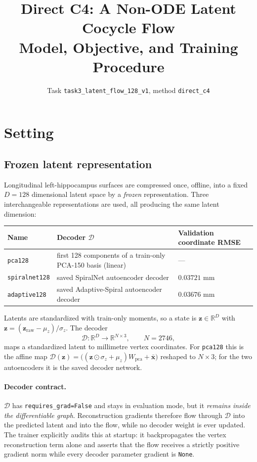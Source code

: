 \documentclass[11pt]{article}
\title{Direct C4: A Non-ODE Latent Cocycle Flow\\
\large Model, Objective, and Training Procedure}
\author{Task \texttt{task3\_latent\_flow\_128\_v1}, method \texttt{direct\_c4}}
\date{}
\newcommand{\R}{\mathbb{R}}
\newcommand{\z}{\bm{z}}
\newcommand{\Dec}{\mathcal{D}}
\begin{document}
\maketitle

\section{Setting}

\subsection{Frozen latent representation}

Longitudinal left-hippocampus surfaces are compressed once, offline, into a fixed
$D = 128$ dimensional latent space by a \emph{frozen} representation. Three
interchangeable representations are used, all producing the same latent dimension:

\begin{center}
\begin{tabular}{lll}
\toprule
Name & Decoder $\Dec$ & Validation coordinate RMSE \\
\midrule
\texttt{pca128}       & first 128 components of a train-only PCA-150 basis (linear) & --- \\
\texttt{spiralnet128} & saved SpiralNet autoencoder decoder & $0.03721$ mm \\
\texttt{adaptive128}  & saved Adaptive-Spiral autoencoder decoder & $0.03676$ mm \\
\bottomrule
\end{tabular}
\end{center}

Latents are standardized with train-only moments, so a state is
$\z \in \R^{D}$ with $\z = (\z_{\mathrm{raw}} - \mu_z)/\sigma_z$. The decoder
\begin{equation}
  \Dec : \R^{D} \longrightarrow \R^{N \times 3}, \qquad N = 2746,
\end{equation}
maps a standardized latent to millimetre vertex coordinates. For \texttt{pca128} this is
the affine map $\Dec(\z) = \bigl((\z \odot \sigma_z + \mu_z) W_{\mathrm{pca}} + \bar{\bm{x}}\bigr)$
reshaped to $N \times 3$; for the two autoencoders it is the saved decoder network.

\paragraph{Decoder contract.} $\Dec$ has \texttt{requires\_grad=False} and stays in
evaluation mode, but it \emph{remains inside the differentiable graph}. Reconstruction
gradients therefore flow through $\Dec$ into the predicted latent and into the flow, while
no decoder weight is ever updated. The trainer explicitly audits this at startup: it
backpropagates the vertex reconstruction term alone and asserts that the flow receives a
strictly positive gradient norm while every decoder parameter gradient is \texttt{None}.
\end{document}
